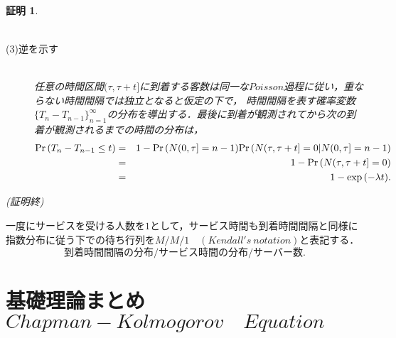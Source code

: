 \documentclass[a4j,papersize,disablejfam,slide,14pt]{jsarticle}
\newtheorem{Proof}{証明}
\def\qed{{\begin{flushright} (証明終) \end{flushright}}} %
\def\exp#1{\mbox{${\rm exp} \left( #1 \right)$}} %
\def\prob#1{\mbox{${\rm Pr} \left( #1 \right)$}} %
\def\cprob#1#2{\mbox{${\rm Pr} \left( #1 | #2 \right)$}} %
\begin{document}
\begin{Proof}
\begin{description}
\begin{eqnarray}
                \end{eqnarray}
            \item[(3)逆を示す]\mbox{}\\
            	任意の時間区間$(\tau, \tau + t]$に到着する客数は同一な$Poisson$過程に従い，重ならない時間間隔では独立となると仮定の下で，
                時間間隔を表す確率変数$\{T_n - T_{n-1}\}_{n=1}^{\infty}$の分布を導出する．最後に到着が観測されてから次の到着が観測されるまでの時間の分布は，
                \begin{eqnarray}
                	\prob{T_n - T_{n-1} \leq t} &=& 1 - \prob{N(0, \tau] = n-1}\cprob{N(\tau, \tau+t] = 0}{N(0, \tau] = n-1} \\
                    &=& 1 - \prob{N(\tau, \tau+t] = 0} \\
                    &=& 1 - \exp{-\lambda t}.
                \end{eqnarray}
    	\end{description}
        \qed
    \end{Proof}
    一度にサービスを受ける人数を$1$として，サービス時間も到着時間間隔と同様に指数分布に従う下での待ち行列を$M/M/1 \quad (Kendall's\ notation)$と表記する．\\
    \[
    	\mbox{到着時間間隔の分布} / \mbox{サービス時間の分布} / \mbox{サーバー数}.
    \]

\newpage
\section{基礎理論まとめ \qquad $Chapman-Kolmogorov\quad Equation$}
	
\scriptsize
\newpage
\end{document}
